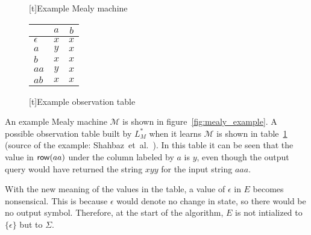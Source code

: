 \begin{figure}[h]
  \begin{minipage}{.45\textwidth}
    \centering
    [t]{Example Mealy machine}
    \label{fig:mealy_example}
  \end{minipage}
%
  \begin{minipage}{.45\textwidth}
    \centering
    \begin{tabular}{ | l || c | c | }
      \hline
                  & $a$   & $b$ \\ \hline \hline
      $\epsilon$  & $x$   & $x$ \\
      $a$         & $y$   & $x$ \\ \hline \hline
      $b$         & $x$   & $x$ \\
      $aa$        & $y$   & $x$ \\
      $ab$        & $x$   & $x$ \\
      \hline
    \end{tabular}
    [t]{Example observation table}
    \label{tbl:mealy_observation_table}
  \end{minipage}
\end{figure}

An example Mealy machine $\mathcal{M}$ is shown in figure~\ref{fig:mealy_example}. A possible observation table built by $L^*_M$ when it
learns $\mathcal{M}$ is shown in table~\ref{tbl:mealy_observation_table} (source
of the example: Shahbaz~et~al.~\cite{Shahbaz2009}). In this table it can be seen
that the value in $\mathsf{row}(aa)$ under the column labeled by $a$ is $y$, even though
the output query would have returned the string $xyy$ for the input string
$aaa$.

With the new meaning of the values in the table, a value of $\epsilon$ in $E$
becomes nonsensical. This is because $\epsilon$ would denote no change in
state, so there would be no output symbol. Therefore, at the start of the
algorithm, $E$ is not intialized to $\{\epsilon\}$ but to $\Sigma$.

